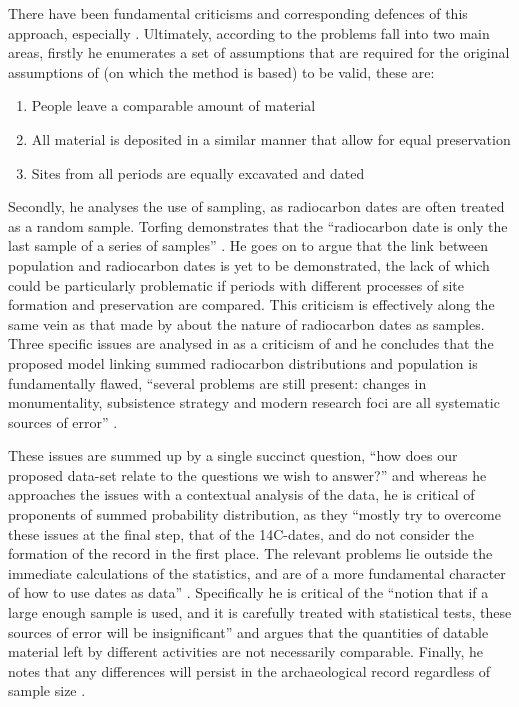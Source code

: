 There have been fundamental criticisms and corresponding defences of this approach, especially \citet{Torfing2015193,Timpson2015199,Torfing2015203}. Ultimately, according to \citet{Torfing2015203} the problems fall into two main areas, firstly he enumerates a set of assumptions that are required for the original assumptions of \citet{10.2307/281060} (on which the method is based) to be valid, these are:
\begin{enumerate}
\item People leave a comparable amount of material
\item All material is deposited in a similar manner that allow for equal preservation
\item Sites from all periods are equally excavated and dated
\end{enumerate}

Secondly, he analyses the use of sampling, as radiocarbon dates are often treated as a random sample. Torfing demonstrates that the ``radiocarbon date is only the last sample of a series of samples'' \citep[205]{Torfing2015203}. He goes on to argue that the link between population and radiocarbon dates is yet to be demonstrated, the lack of which could be particularly problematic if periods with different processes of site formation and preservation are compared. This criticism is effectively along the same vein as that made by \citet{CAJ:676108} about the nature of radiocarbon dates as samples. Three specific issues are analysed in \citet{Torfing2015193} as a criticism of \citet{Shennan:2013fk} and he concludes that the proposed model linking summed radiocarbon distributions and population is fundamentally flawed, ``several problems are still present: changes in monumentality, subsistence strategy and modern research foci are all systematic sources of error'' \citep[197]{Torfing2015193}.

These issues are summed up by a single succinct question, ``how does our proposed data-set relate to the questions we wish to answer?'' \citep[204]{Torfing2015203} and whereas he approaches the issues with a contextual analysis of the data, he is critical of proponents of summed probability distribution, as they ``mostly try to overcome these issues at the final step, that of the 14C-dates, and do not consider the formation of the record in the first place. The relevant problems lie outside the immediate calculations of the statistics, and are of a more fundamental character of how to use dates as data'' \citep[204]{Torfing2015203}. Specifically he is critical of the ``notion that if a large enough sample is used, and it is carefully treated with statistical tests, these sources of error will be insignificant'' \citep[193]{Torfing2015193} and argues that the quantities of datable material left by different activities are not necessarily comparable. Finally, he notes that any differences will persist in the archaeological record regardless of sample size \citep[193]{Torfing2015193}. 

